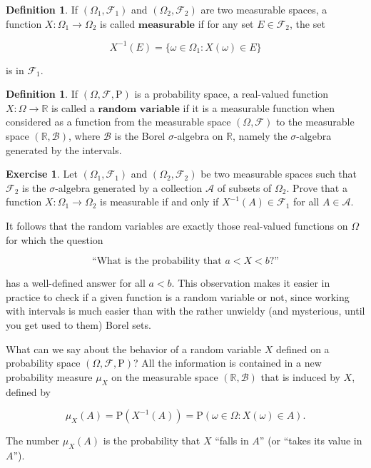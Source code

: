 \documentclass[11pt]{report}
\providecommand{\cal}{\mathcal}
\newcommand{\R}{\mathbb{R}}
\theoremstyle{plain}
\theoremstyle{definition}
\newtheorem{defn}[thm]{Definition}
\newtheorem{xexercise}[thm]{Exercise}
\begin{document}
\begin{defn}
If $(\Omega_1, {\cal F}_1)$ and
$(\Omega_2, {\cal F}_2)$ are two measurable spaces, a
function $X:\Omega_1\to \Omega_2$ is called
$\textbf{measurable}$ if for any set
$E \in {\cal F}_2$, the set

\[
X^{-1}(E) = \{ \omega \in \Omega_1 : X(\omega) \in E \}
\]

\noindent is in ${\cal F}_1$.
\end{defn}

\begin{defn}
If $(\Omega, {\cal F}, \mathrm{P})$ is a probability
space, a real-valued function $X:\Omega \to \R$ is
called a $\textbf{random variable}$ if it is a
measurable function when considered as a function from
the measurable space $(\Omega, {\cal F})$ to the
measurable space $(\R, {\cal B})$, where ${\cal B}$
is the Borel $\sigma$-algebra on $\R$, namely the
$\sigma$-algebra generated by the intervals.
\end{defn}

\begin{xexercise}
\label{ex-checkrv}
Let $(\Omega_1, {\cal F}_1)$ and
$(\Omega_2, {\cal F}_2)$ be two measurable spaces
such that ${\cal F}_2$ is the $\sigma$-algebra
generated by a collection ${\cal A}$ of subsets of
$\Omega_2$. Prove that a function
$X:\Omega_1 \to \Omega_2$ is measurable if and only
if $X^{-1}(A) \in {\cal F}_1$ for all
$A \in {\cal A}$.
\end{xexercise}

\noindent It follows that the random variables are exactly
those real-valued functions on $\Omega$ for which the
question

\[
\textrm{``What is the probability that $a < X < b$?''}
\]

\noindent has a well-defined answer for all $a<b$. This
observation makes it easier in practice to check if a
given function is a random variable or not, since
working with intervals is much easier than with the
rather unwieldy (and mysterious, until you get used to
them) Borel sets.

What can we say about the behavior of a random
variable $X$ defined on a probability space
$(\Omega, {\cal F}, \mathrm{P})$? All the information
is contained in a new probability measure $\mu_X$ on
the measurable space $(\R, {\cal B})$ that is induced
by $X$, defined by

\[
\mu_X(A) = \mathrm{P}(X^{-1}(A)) = \mathrm{P}(\omega \in \Omega : X(\omega) \in A).
\]

\noindent The number $\mu_X(A)$ is the probability that $X$
``falls in $A$'' (or ``takes its value in $A$'').
\end{document}
